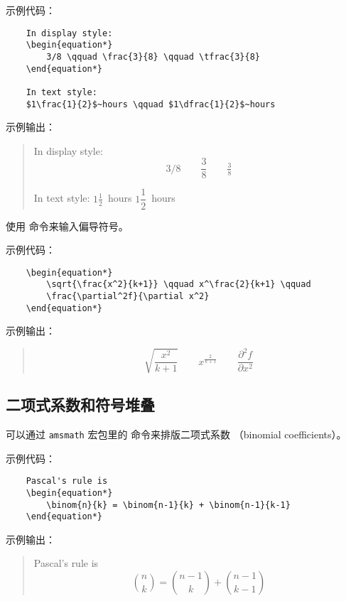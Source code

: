 \documentclass[UTF8]{ctexart}
\begin{document}
示例代码：
\begin{verbatim}
    In display style:
    \begin{equation*}
        3/8 \qquad \frac{3}{8} \qquad \tfrac{3}{8}
    \end{equation*}

    In text style:
    $1\frac{1}{2}$~hours \qquad $1\dfrac{1}{2}$~hours
\end{verbatim}

示例输出：
\begin{quote}
    In display style:
    \begin{equation*}
        3/8 \qquad \frac{3}{8} \qquad \tfrac{3}{8}
    \end{equation*}

    In text style:
    $1\frac{1}{2}$~hours \qquad $1\dfrac{1}{2}$~hours
\end{quote}

使用 \texttt{\partial} 命令来输入偏导符号。

示例代码：
\begin{verbatim}
    \begin{equation*}
        \sqrt{\frac{x^2}{k+1}} \qquad x^\frac{2}{k+1} \qquad
        \frac{\partial^2f}{\partial x^2}
    \end{equation*}
\end{verbatim}

示例输出：
\begin{quote}
    \begin{equation*}
        \sqrt{\frac{x^2}{k+1}} \qquad x^\frac{2}{k+1} \qquad
        \frac{\partial^2f}{\partial x^2}
    \end{equation*}
\end{quote}

\subsection{二项式系数和符号堆叠}
可以通过 \texttt{amsmath} 宏包里的 \texttt{\binom} 命令来排版二项式系数
（binomial coefficients）。

示例代码：
\begin{verbatim}
    Pascal's rule is
    \begin{equation*}
        \binom{n}{k} = \binom{n-1}{k} + \binom{n-1}{k-1}
    \end{equation*}
\end{verbatim}

示例输出：
\begin{quote}
    Pascal's rule is
    \begin{equation*}
        \binom{n}{k} = \binom{n-1}{k} + \binom{n-1}{k-1}
    \end{equation*}
\end{quote}
\end{document}
